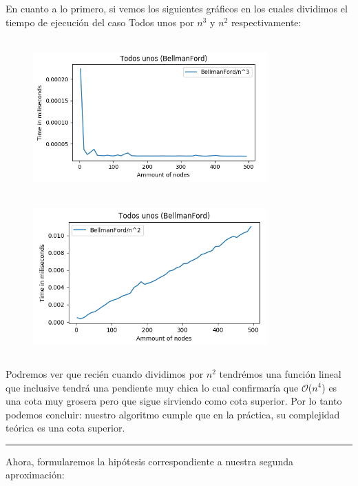 \documentclass[11pt,a4paper]{article}
\begin{document}
En cuanto a lo primero, si vemos los siguientes gr\'aficos en los cuales dividimos el tiempo de ejecuci\'on del caso Todos unos por $n^{3}$ y $n^{2}$ respectivamente:

\begin{figure}[h]
		\includegraphics[height = 6cm,width = 9cm]{BF3-unos.png}
    	\includegraphics[height = 6cm,width = 9cm]{BF2-unos.png}
\end{figure}

Podremos ver que reci\'en cuando dividimos por $n^{2}$ tendr\'emos una funci\'on lineal que inclusive tendr\'a una pendiente muy chica lo cual confirmar\'ia que $\mathcal{O}$($n^{4}$) es una cota muy grosera pero que sigue sirviendo como cota superior.
Por lo tanto podemos concluir: nuestro algoritmo cumple que en la pr\'actica, su complejidad te\'orica es una cota superior.
\\
\begin{center}
  \rule{100mm}{0.1mm}  
\end{center}


Ahora, formularemos la hip\'otesis correspondiente a nuestra segunda aproximaci\'on:
\end{document}
